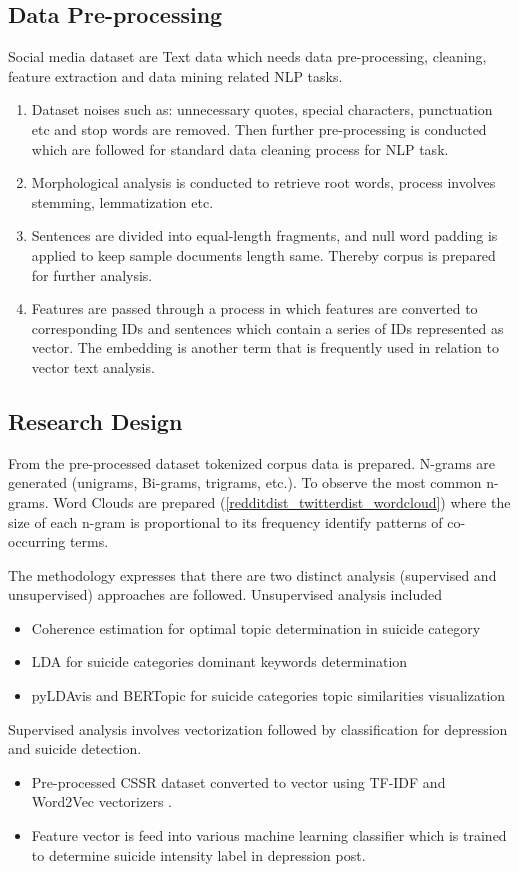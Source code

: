 \documentclass[sn-mathphys,Numbered]{sn-jnl}%
\theoremstyle{thmstyleone}%
\theoremstyle{thmstyletwo}%
\theoremstyle{thmstylethree}%
\begin{document}
\subsection{Data Pre-processing}\label{data_preprocessing}
Social media dataset are Text data which needs data pre-processing, cleaning, feature extraction and data mining related NLP tasks.
\begin{enumerate}[label=(\roman*)]
\item Dataset noises such as: unnecessary quotes, special characters, punctuation etc and stop words are removed. Then further pre-processing is conducted which are followed for standard data cleaning process for NLP task. 
\item Morphological analysis is conducted to retrieve root words, process involves stemming, lemmatization etc.
\item Sentences are divided into equal-length fragments, and null word padding is applied to keep sample documents length same. Thereby corpus is prepared for further analysis.
\item Features are passed through a process in which features are converted to corresponding IDs and sentences which contain a series of IDs represented as vector. The embedding is another term that is frequently used in relation to vector text analysis. 
\end{enumerate}

\subsection{Research Design}
From the pre-processed dataset tokenized corpus data is prepared. N-grams are generated (unigrams, Bi-grams, trigrams, etc.). To observe the most common n-grams. Word Clouds are prepared (\ref{redditdist_twitterdist_wordcloud}) where the size of each n-gram is proportional to its frequency identify patterns of co-occurring terms. 

The methodology expresses that there are two distinct analysis (supervised and unsupervised) approaches are followed. 
Unsupervised analysis included 
\begin{itemize}
\item Coherence estimation for optimal topic determination in suicide category
\item LDA for suicide categories dominant keywords determination
\item pyLDAvis and BERTopic for suicide categories topic similarities visualization
\end{itemize}
Supervised analysis involves vectorization followed by classification for depression and suicide detection. 
\begin{itemize}
\item Pre-processed CSSR dataset converted to vector using TF-IDF and Word2Vec vectorizers \cite{aldhyani2022detecting, wang2020depression, shetty2020predicting}. 
\item Feature vector is feed into various machine learning classifier which is trained to determine suicide intensity label in depression post.  
\end{itemize}
\end{document}
